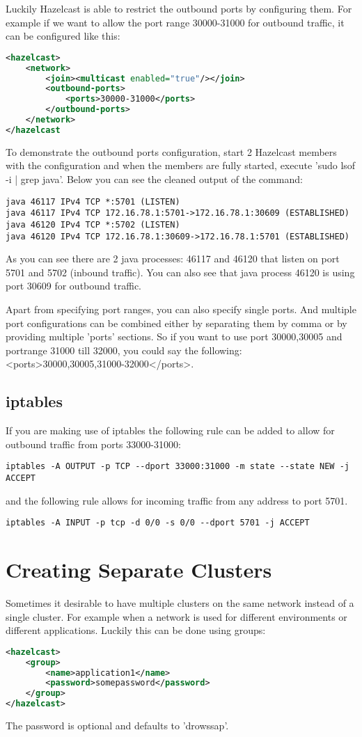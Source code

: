 Luckily Hazelcast is able to restrict the outbound ports by configuring them. For example if we want to allow the port range 30000-31000 for outbound traffic, it can be configured like this:
\begin{lstlisting}[language=xml]
<hazelcast>
    <network>
        <join><multicast enabled="true"/></join>
        <outbound-ports>
            <ports>30000-31000</ports>
        </outbound-ports>
    </network>
</hazelcast
\end{lstlisting}
To demonstrate the outbound ports configuration, start 2 Hazelcast members with the configuration and when the members are fully started, execute 'sudo lsof -i | grep java'. Below you can see the cleaned output of the command:
\begin{lstlisting}
java 46117 IPv4 TCP *:5701 (LISTEN)
java 46117 IPv4 TCP 172.16.78.1:5701->172.16.78.1:30609 (ESTABLISHED)
java 46120 IPv4 TCP *:5702 (LISTEN)
java 46120 IPv4 TCP 172.16.78.1:30609->172.16.78.1:5701 (ESTABLISHED)
\end{lstlisting}
As you can see there are 2 java processes: 46117 and 46120 that listen on port 5701 and 5702 (inbound traffic). You can also see that java process 46120 is using port 30609 for outbound traffic.

Apart from specifying port ranges, you can also specify single ports. And multiple port configurations can be combined either by separating them by comma or by providing multiple 'ports' sections. So if you want to use port 30000,30005 and portrange 31000 till 32000, you could say the following: <ports>30000,30005,31000-32000</ports>. 

\subsection{iptables}
If you are making use of iptables the following rule can be added to allow for outbound traffic from ports 33000-31000:
\begin{lstlisting}
iptables -A OUTPUT -p TCP --dport 33000:31000 -m state --state NEW -j ACCEPT
\end{lstlisting}
and the following rule allows for incoming traffic from any address to port 5701.
\begin{lstlisting}
iptables -A INPUT -p tcp -d 0/0 -s 0/0 --dport 5701 -j ACCEPT
\end{lstlisting}

\section{Creating Separate Clusters}
Sometimes it desirable to have multiple clusters on the same network instead of a single cluster. For example when a network is used for different environments or different applications. Luckily this can be done using groups:
\begin{lstlisting}[language=xml]
<hazelcast>
    <group>
        <name>application1</name>
        <password>somepassword</password>
    </group>
</hazelcast>
\end{lstlisting}
The password is optional and defaults to 'drowssap'.

